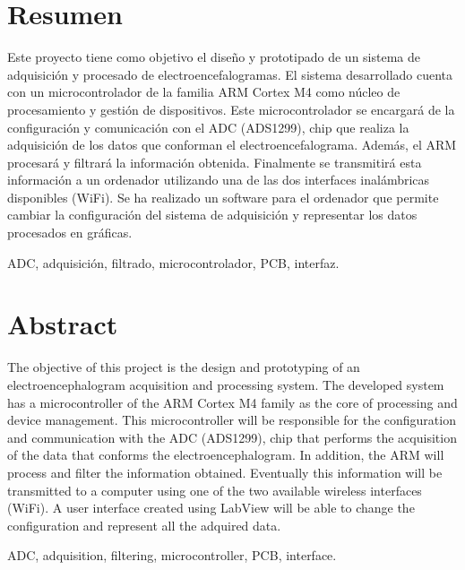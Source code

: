 \chapter*{Resumen}

\begin{abstractEs}

Este proyecto tiene como objetivo el diseño y prototipado de un sistema de adquisición y procesado de electroencefalogramas. 
El sistema desarrollado cuenta con un microcontrolador de la familia ARM Cortex M4 como núcleo de procesamiento y gestión de dispositivos. Este microcontrolador se encargará de la configuración y comunicación con el ADC (ADS1299), chip que realiza la adquisición de los datos que conforman el electroencefalograma. Además, el ARM procesará y filtrará la información obtenida.
Finalmente se transmitirá esta información a un ordenador utilizando una de las dos interfaces inalámbricas disponibles (WiFi). Se ha realizado un software para el ordenador que permite cambiar la configuración del sistema de adquisición y representar los datos procesados en gráficas.
	
\end{abstractEs}

\begin{keywordsEs}
	ADC, adquisición, filtrado, microcontrolador, PCB, interfaz.
\end{keywordsEs}


\chapter*{Abstract}

\begin{abstractEn}

The objective of this project is the design and prototyping of an electroencephalogram acquisition and processing system.
The developed system has a microcontroller of the ARM Cortex M4 family as the core of processing and device management. This microcontroller will be responsible for the configuration and communication with the ADC (ADS1299), chip that performs the acquisition of the data that conforms the electroencephalogram. In addition, the ARM will process and filter the information obtained.
Eventually this information will be transmitted to a computer using one of the two available wireless interfaces (WiFi). A user interface created using LabView will be able to change the configuration and represent all the adquired data.

\end{abstractEn}

\begin{keywordsEn}
ADC, adquisition, filtering, microcontroller, PCB, interface.
\end{keywordsEn}


